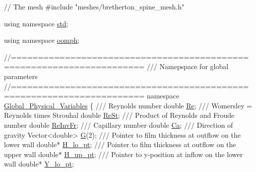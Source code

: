 \begin{DoxyCodeInclude}
\textcolor{comment}{// The mesh}
\textcolor{preprocessor}{#include "meshes/bretherton\_spine\_mesh.h"}

\textcolor{keyword}{using namespace }\hyperlink{namespacestd}{std};
 
\textcolor{keyword}{using namespace }\hyperlink{namespaceoomph}{oomph};

\textcolor{comment}{//======================================================================}\textcolor{comment}{}
\textcolor{comment}{/// Namepspace for global parameters}
\textcolor{comment}{}\textcolor{comment}{//======================================================================}
\textcolor{keyword}{namespace }\hyperlink{namespaceGlobal__Physical__Variables}{Global\_Physical\_Variables}
\{
 \textcolor{comment}{}
\textcolor{comment}{ /// Reynolds number}
\textcolor{comment}{} \textcolor{keywordtype}{double} \hyperlink{namespaceGlobal__Physical__Variables_ab814e627d2eb5bc50318879d19ab16b9}{Re};
\textcolor{comment}{}
\textcolor{comment}{ /// Womersley = Reynolds times Strouhal}
\textcolor{comment}{} \textcolor{keywordtype}{double} \hyperlink{namespaceGlobal__Physical__Variables_a085ee4bf968ffdd01a41b8c41864f907}{ReSt}; 
 \textcolor{comment}{}
\textcolor{comment}{ /// Product of Reynolds and Froude number}
\textcolor{comment}{} \textcolor{keywordtype}{double} \hyperlink{namespaceGlobal__Physical__Variables_aa6286f02b476912dd7550eced538331a}{ReInvFr};
\textcolor{comment}{}
\textcolor{comment}{ /// Capillary number}
\textcolor{comment}{} \textcolor{keywordtype}{double} \hyperlink{namespaceGlobal__Physical__Variables_a8b32b93d2e546f9375ec418474107838}{Ca};  
\textcolor{comment}{}
\textcolor{comment}{ /// Direction of gravity}
\textcolor{comment}{} Vector<double> \hyperlink{namespaceGlobal__Physical__Variables_a18fe245262ec8beec764c805bb93e73c}{G}(2);
\textcolor{comment}{}
\textcolor{comment}{ /// Pointer to film thickness at outflow on the lower wall}
\textcolor{comment}{} \textcolor{keywordtype}{double}* \hyperlink{namespaceGlobal__Physical__Variables_a137bdac2ad4b72a03ec9916e8ee7395b}{H\_lo\_pt};
\textcolor{comment}{}
\textcolor{comment}{ /// Pointer to film thickness at outflow on the upper wall}
\textcolor{comment}{} \textcolor{keywordtype}{double}* \hyperlink{namespaceGlobal__Physical__Variables_a83a3a82f89784013805bd23d63faa7e3}{H\_up\_pt};
\textcolor{comment}{}
\textcolor{comment}{ /// Pointer to y-position at inflow on the lower wall}
\textcolor{comment}{} \textcolor{keywordtype}{double}* \hyperlink{namespaceGlobal__Physical__Variables_a84caa2a64e50ba5b390a3cd100f0f835}{Y\_lo\_pt};
\textcolor{comment}{}

\end{DoxyCodeInclude}
